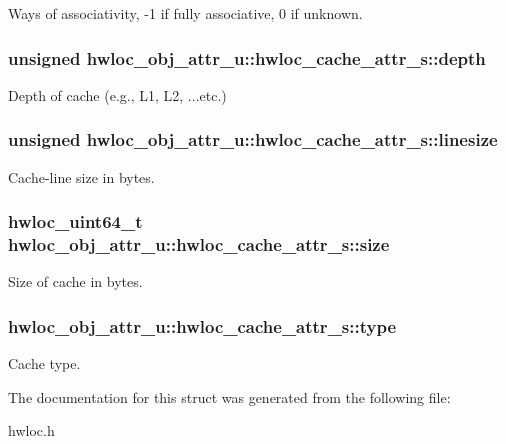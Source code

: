 Ways of associativity, -\/1 if fully associative, 0 if unknown. 

\hypertarget{a00013_a5c8f7f39193736c2187ed626940835d5}{
\subsubsection[{depth}]{\setlength{\rightskip}{0pt plus 5cm}unsigned {\bf hwloc\_\-obj\_\-attr\_\-u::hwloc\_\-cache\_\-attr\_\-s::depth}}}
\label{a00013_a5c8f7f39193736c2187ed626940835d5}


Depth of cache (e.g., L1, L2, ...etc.) 

\hypertarget{a00013_a801e8a668e28caf06c8b88e9ae5c10db}{
\subsubsection[{linesize}]{\setlength{\rightskip}{0pt plus 5cm}unsigned {\bf hwloc\_\-obj\_\-attr\_\-u::hwloc\_\-cache\_\-attr\_\-s::linesize}}}
\label{a00013_a801e8a668e28caf06c8b88e9ae5c10db}


Cache-\/line size in bytes. 

\hypertarget{a00013_abe5e788943ed04302976740c829674c0}{
\subsubsection[{size}]{\setlength{\rightskip}{0pt plus 5cm}hwloc\_\-uint64\_\-t {\bf hwloc\_\-obj\_\-attr\_\-u::hwloc\_\-cache\_\-attr\_\-s::size}}}
\label{a00013_abe5e788943ed04302976740c829674c0}


Size of cache in bytes. 

\hypertarget{a00013_ad8edc8ded2b7a70d6abbc874801930f4}{
\subsubsection[{type}]{ {\bf hwloc\_\-obj\_\-attr\_\-u::hwloc\_\-cache\_\-attr\_\-s::type}}}
\label{a00013_ad8edc8ded2b7a70d6abbc874801930f4}


Cache type. 



The documentation for this struct was generated from the following file:\begin{DoxyCompactItemize}
\item 
hwloc.h\end{DoxyCompactItemize}
